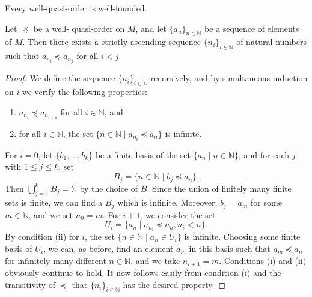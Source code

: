 \begin{corollary}\label{cor:wqo_is_wellFounded} %
    Every well-quasi-order is well-founded.
\end{corollary}
    
\begin{proposition}\label{prop:wqoAscendingSubsequence} %
    \leanok
    Let $\preceq$ be a well- quasi-order on $M$, and let $\{a_n\}_{n \in \mathbb{N}}$ be a sequence of elements of $M$.
    Then there exists a strictly ascending sequence $\{n_i\}_{i \in \mathbb{N}}$ of natural numbers such that $a_{n_i} \preceq a_{n_j}$ for all $i < j$.
\end{proposition}
\begin{proof}
  We define the sequence $\{n_i\}_{i \in \mathbb{N}}$ recursively, and by simultaneous induction on $i$ we verify the following properties:
  \begin{enumerate}
      \item $a_{n_i} \preceq a_{n_{i+1}}$ for all $i \in \mathbb{N}$, and
      \item for all $i \in \mathbb{N}$, the set $\{n \in \mathbb{N} \mid a_{n_i} \preceq a_n\}$ is infinite.
  \end{enumerate}
  For $i=0$, let $\{b_1, \dots, b_k\}$ be a finite basis of the set $\{a_n \mid n \in \mathbb{N}\}$, and for each $j$ with $1 \le j \le k$, set
  \[
  B_j = \{n \in \mathbb{N} \mid b_j \preceq a_n\}.
  \]
  Then $\bigcup_{j=1}^k B_j = \mathbb{N}$ by the choice of $B$. 
  Since the union of finitely many finite sets is finite, we can find a $B_j$ which is infinite. 
  Moreover, $b_j = a_m$ for some $m \in \mathbb{N}$, and we set $n_0 = m$. 
  For $i+1$, we consider the set
  \[
  U_i = \{a_n \mid a_{n_i} \preceq a_n, n_i < n\}.
  \]
  By condition (ii) for $i$, the set $\{n \in \mathbb{N} \mid a_n \in U_i\}$ is infinite. 
  Choosing some finite basis of $U_i$, we can, as before, find an element $a_m$ in this basis such that $a_m \preceq a_n$ for infinitely many different $n \in \mathbb{N}$, and we take $n_{i+1} = m$. 
  Conditions (i) and (ii) obviously continue to hold. 
  It now follows easily from condition (i) and the transitivity of $\preceq$ that $\{n_i\}_{i \in \mathbb{N}}$ has the desired property.
\end{proof}

